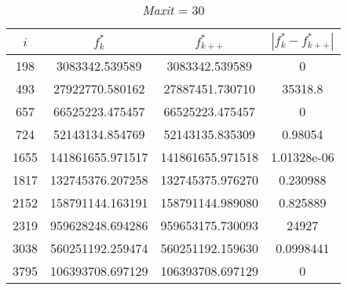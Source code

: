 \documentclass[12pt,a4paper,oneside,hidelinks]{report}
\begin{document}
\begin{table}[ht]
	\begin{subtable}{\textwidth}
		\centering
		\begin{tabular}{|S[table-parse-only = true]
						|S[table-format = 9.6, table-number-alignment = center]
						|S[table-format = 9.6, table-number-alignment = center]
						|S[table-parse-only = true]|}
			
			\hline			
			{$i$} & {$f_{k}^*$} & {$f_{k++}^*$} & {$|f_{k}^* - f_{k++}^*|$} \\
			
			\hline		
			
			198  &  3083342.539589   & 3083342.539589   & 0  \\
			493  &  27922770.580162  & 27887451.730710  & 35318.8 \\
			657  &  66525223.475457  & 66525223.475457  & 0\\
			724  &  52143134.854769  & 52143135.835309  & 0.98054\\
			1655 &  141861655.971517 & 141861655.971518 & 1.01328e-06 \\
			1817 &  132745376.207258 & 132745375.976270 & 0.230988 \\
			2152 &	158791144.163191 & 158791144.989080 & 0.825889 \\
			2319 &  959628248.694286 & 959653175.730093 & 24927 \\
			3038 &  560251192.259474 & 560251192.159630 & 0.0998441 \\
			3795 &  106393708.697129 & 106393708.697129 & 0 \\
			
			\hline
		\end{tabular}
		
		\vspace*{0.4 cm}
		\caption{\textit{Maxit} = 30}
	\end{subtable}%
\end{table}

\vspace*{\fill}

\clearpage

\vspace*{\fill}
\end{document}

